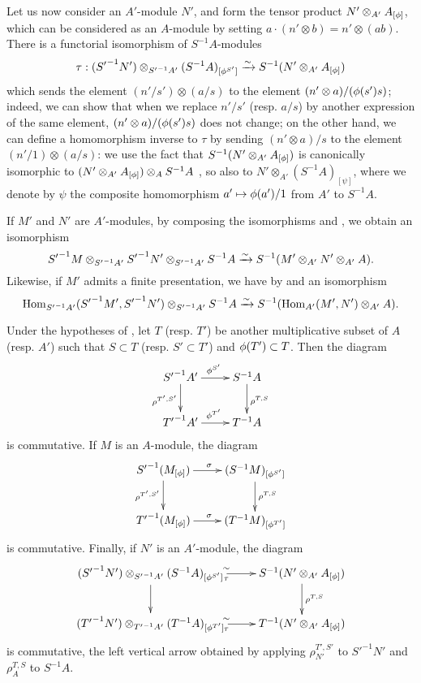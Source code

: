 \begin{env}[1.5.4]
\label{0.1.5.4}
Let us now consider an $A'$-module $N'$, and form the tensor product
$N'\otimes_{A'}A_{[\phi]}$, which can be considered as an $A$-module by setting
$a\cdot(n'\otimes b)=n'\otimes(ab)$. There is a functorial isomorphism of
$S^{-1}A$-modules
\[
  \tau:({S'}^{-1}N')\otimes_{{S'}^{-1}A'}(S^{-1}A)_{[\phi^{S'}]}
  \xrightarrow{\sim} S^{-1}(N'\otimes_{A'}A_{[\phi]})
\]
which sends the element $(n'/s')\otimes(a/s)$ to the element
$(n'\otimes a)/(\phi(s')s)$; indeed, we can show that when we replace
$n'/s'$ (resp. $a/s$) by another expression of the same element,
$(n'\otimes a)/(\phi(s')s)$ does not change; on the other hand, we can define
a homomorphism inverse to $\tau$ by sending $(n'\otimes a)/s$ to the element
$(n'/1)\otimes(a/s)$: we use the fact that $S^{-1}(N'\otimes_{A'}A_{[\phi]})$
is canonically isomorphic to $(N'\otimes_{A'}A_{[\phi]})\otimes_A S^{-1}A$
, so also to $N'\otimes_{A'}(S^{-1}A)_{[\psi]}$, where we
denote by $\psi$ the composite homomorphism $a'\mapsto\phi(a')/1$ from $A'$ to
$S^{-1}A$.
\end{env}

\begin{env}[1.5.5]
\label{0.1.5.5}
If $M'$ and $N'$ are $A'$-modules, by composing the isomorphisms
 and , we obtain an isomorphism
\[
  {S'}^{-1}M\otimes_{{S'}^{-1}A'}{S'}^{-1}N'\otimes_{{S'}^{-1}A'}S^{-1}A
  \xrightarrow{\sim} S^{-1}(M'\otimes_{A'}N'\otimes_{A'}A).
\]
Likewise, if $M'$ admits a finite presentation, we have by  and
 an isomorphism
\[
  {\mathop{\mathrm{Hom}}\nolimits}_{{S'}^{-1}A'}({S'}^{-1}M',{S'}^{-1}N')\otimes_{{S'}^{-1}A'}S^{-1}A
  \xrightarrow{\sim} S^{-1}({\mathop{\mathrm{Hom}}\nolimits}_{A'}(M',N')\otimes_{A'}A).
\]
\end{env}

\begin{env}[1.5.6]
\label{0.1.5.6}
Under the hypotheses of , let $T$ (resp. $T'$) be another
multiplicative subset of $A$ (resp. $A'$) such that $S\subset T$
(resp. $S'\subset T'$) and $\phi(T')\subset T$. Then the diagram
\[
  \xymatrix{
    {S'}^{-1}A'\ar[r]^{\vphi^{S'}}\ar[d]_{\rho^{T',S'}} &
    S^{-1}A\ar[d]^{\rho^{T,S}}\\
    {T'}^{-1}A'\ar[r]^{\vphi^{T'}} &
    T^{-1}A
  }
\]
is commutative. If $M$ is an $A$-module, the diagram
\[
  \xymatrix{
    {S'}^{-1}(M_{[\vphi]})\ar[r]^\sigma\ar[d]_{\rho^{T',S'}} &
    (S^{-1}M)_{[\vphi^{S'}]}\ar[d]^{\rho^{T,S}}\\
    {T'}^{-1}(M_{[\vphi]})\ar[r]^\sigma &
    (T^{-1}M)_{[\vphi^{T'}]}
  }
\]
is commutative. Finally, if $N'$ is an $A'$-module, the diagram
\[
  \xymatrix{
    ({S'}^{-1}N')\otimes_{{S'}^{-1}A'}(S^{-1}A)_{[\vphi^{S'}]}
      \ar[r]^\sim_\tau\ar[d] &
    S^{-1}(N'\otimes_{A'}A_{[\vphi]})\ar[d]^{\rho^{T,S}}\\
    ({T'}^{-1}N')\otimes_{{T'}^{-1}A'}(T^{-1}A)_{[\vphi^{T'}]}
      \ar[r]^\sim_\tau &
    T^{-1}(N'\otimes_{A'}A_{[\vphi]})
  }
\]
is commutative, the left vertical arrow obtained by applying
$\rho_{N'}^{T',S'}$ to ${S'}^{-1}N'$ and $\rho_A^{T,S}$ to $S^{-1}A$.
\end{env}

